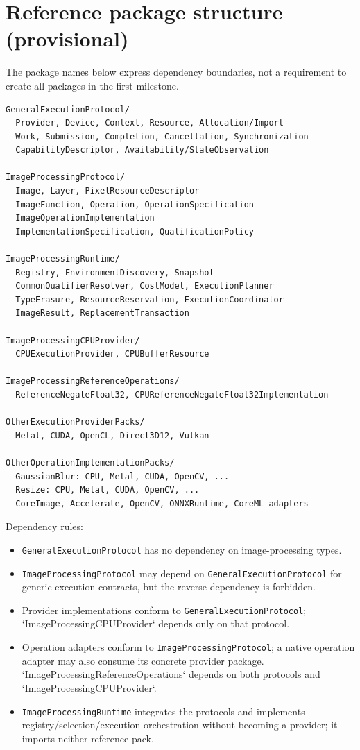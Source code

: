 \documentclass[11pt,a4paper,oneside]{article}
\begin{document}
\section{Reference package structure (provisional)}

The package names below express dependency boundaries, not a requirement to create all packages in the first milestone.
\begin{lstlisting}
GeneralExecutionProtocol/
  Provider, Device, Context, Resource, Allocation/Import
  Work, Submission, Completion, Cancellation, Synchronization
  CapabilityDescriptor, Availability/StateObservation

ImageProcessingProtocol/
  Image, Layer, PixelResourceDescriptor
  ImageFunction, Operation, OperationSpecification
  ImageOperationImplementation
  ImplementationSpecification, QualificationPolicy

ImageProcessingRuntime/
  Registry, EnvironmentDiscovery, Snapshot
  CommonQualifierResolver, CostModel, ExecutionPlanner
  TypeErasure, ResourceReservation, ExecutionCoordinator
  ImageResult, ReplacementTransaction

ImageProcessingCPUProvider/
  CPUExecutionProvider, CPUBufferResource

ImageProcessingReferenceOperations/
  ReferenceNegateFloat32, CPUReferenceNegateFloat32Implementation

OtherExecutionProviderPacks/
  Metal, CUDA, OpenCL, Direct3D12, Vulkan

OtherOperationImplementationPacks/
  GaussianBlur: CPU, Metal, CUDA, OpenCV, ...
  Resize: CPU, Metal, CUDA, OpenCV, ...
  CoreImage, Accelerate, OpenCV, ONNXRuntime, CoreML adapters
\end{lstlisting}

Dependency rules:
\begin{itemize}
  \item \texttt{GeneralExecution\allowbreak Protocol} has no dependency on image-processing types.
  \item \texttt{ImageProcessing\allowbreak Protocol} may depend on \texttt{GeneralExecution\allowbreak Protocol} for generic execution contracts, but the reverse dependency is forbidden.
  \item Provider implementations conform to \texttt{GeneralExecution\allowbreak Protocol}; `ImageProcessingCPUProvider` depends only on that protocol.
  \item Operation adapters conform to \texttt{ImageProcessing\allowbreak Protocol}; a native operation adapter may also consume its concrete provider package. `ImageProcessingReferenceOperations` depends on both protocols and `ImageProcessingCPUProvider`.
  \item \texttt{ImageProcessingRuntime} integrates the protocols and implements registry/selection/execution orchestration without becoming a provider; it imports neither reference pack.
\end{itemize}
\end{document}
